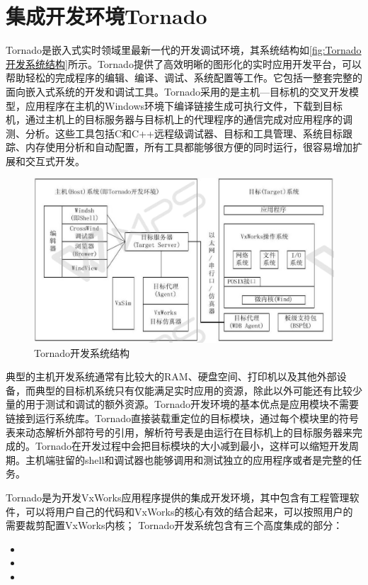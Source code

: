 \section{集成开发环境Tornado}
	Tornado是嵌入式实时领域里最新一代的开发调试环境，其系统结构如\autoref{fig:Tornado开发系统结构}所示。Tornado提供了高效明晰的图形化的实时应用开发平台，可以帮助轻松的完成程序的编辑、编译、调试、系统配置等工作。它包括一整套完整的面向嵌入式系统的开发和调试工具。Tornado采用的是主机—目标机的交叉开发模型，应用程序在主机的Windows环境下编译链接生成可执行文件，下载到目标机，通过主机上的目标服务器与目标机上的代理程序的通信完成对应用程序的调测、分析。这些工具包括C和C++远程级调试器、目标和工具管理、系统目标跟踪、内存使用分析和自动配置，所有工具都能够很方便的同时运行，很容易增加扩展和交互式开发。
\begin{figure}[!h]
\centering
\includegraphics[width=1.0\textwidth]{./graphics/tornado-system-structure.pdf}
\caption{Tornado开发系统结构}\label{fig:Tornado开发系统结构}
\end{figure}
	
	典型的主机开发系统通常有比较大的RAM、硬盘空间、打印机以及其他外部设备，而典型的目标机系统只有仅能满足实时应用的资源，除此以外可能还有比较少量的用于测试和调试的额外资源。Tornado开发环境的基本优点是应用模块不需要链接到运行系统库。Tornado直接装载重定位的目标模块，通过每个模块里的符号表来动态解析外部符号的引用，解析符号表是由运行在目标机上的目标服务器来完成的。Tornado在开发过程中会把目标模块的大小减到最小，这样可以缩短开发周期。主机端驻留的shell和调试器也能够调用和测试独立的应用程序或者是完整的任务。

	Tornado是为开发VxWorks应用程序提供的集成开发环境，其中包含有工程管理软件，可以将用户自己的代码和VxWorks的核心有效的结合起来，可以按照用户的需要裁剪配置VxWorks内核；
Tornado开发系统包含有三个高度集成的部分：
\begin{itemize}
\item {}
\item {}
\item {} 
\end{itemize}

